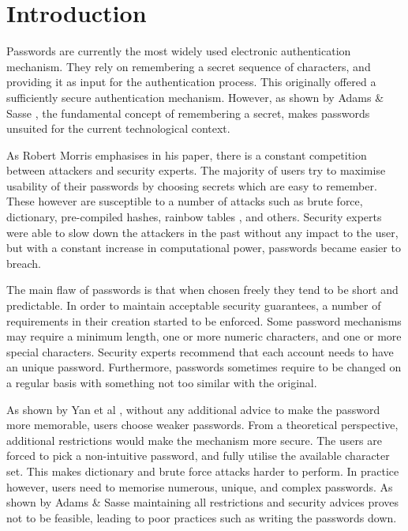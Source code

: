 
\chapter{Introduction} %

\label{Chapter1}


Passwords are currently the most widely used electronic authentication mechanism. They rely on remembering a secret sequence of characters, and providing it as input for the authentication process. This originally offered a sufficiently secure authentication mechanism. However, as shown by Adams \& Sasse \cite{adams1999users}, the fundamental concept of remembering a secret, makes passwords unsuited for the current technological context. 

As Robert Morris \cite{morris1979password} emphasises in his paper, there is a constant competition between attackers and security experts. The majority of users try to maximise usability of their passwords by choosing secrets which are easy to remember. These however are susceptible to a number of attacks such as brute force, dictionary, pre-compiled hashes, rainbow tables \cite{oechslin2003making}, and others. Security experts were able to slow down the attackers in the past without any impact to the user, but with a constant increase in computational power, passwords became easier to breach. 

The main flaw of passwords is that when chosen freely they tend to be short and predictable. In order to maintain acceptable security guarantees, a number of requirements in their creation started to be enforced. Some password mechanisms may require a minimum length, one or more numeric characters, and one or more special characters. Security experts recommend that each account needs to have an unique password. Furthermore, passwords sometimes require to be changed on a regular basis with something not too similar with the original. 

As shown by Yan et al \cite{yan2004password}, without any additional advice to make the password more memorable, users choose weaker passwords. From a theoretical perspective, additional restrictions would make the mechanism more secure. The users are forced to pick a non-intuitive password, and fully utilise the available character set. This makes dictionary and brute force attacks harder to perform. In practice however, users need to memorise numerous, unique, and complex passwords. As shown by Adams \& Sasse \cite{adams1999users} maintaining all restrictions and security advices proves not to be feasible, leading to poor practices such as writing the passwords down.

